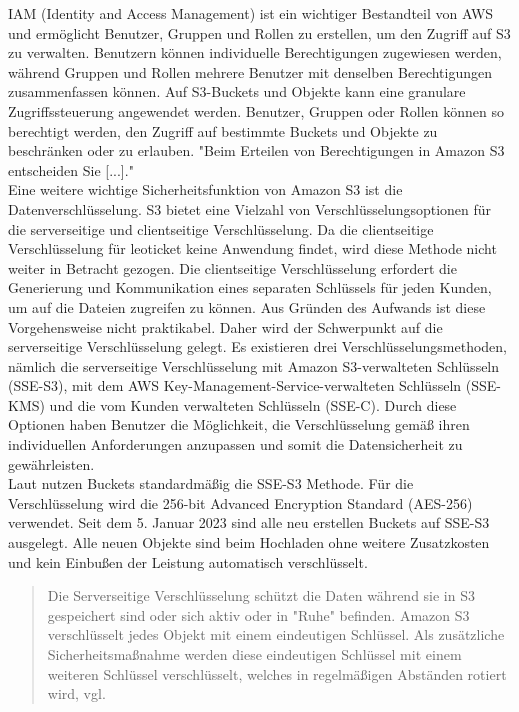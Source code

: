 IAM (Identity and Access Management) ist ein wichtiger Bestandteil von AWS und ermöglicht Benutzer, Gruppen und Rollen zu erstellen, um den Zugriff auf S3 zu verwalten. Benutzern können individuelle Berechtigungen zugewiesen werden, während Gruppen und Rollen mehrere Benutzer mit denselben Berechtigungen zusammenfassen können. Auf S3-Buckets und Objekte kann eine granulare Zugriffssteuerung angewendet werden. Benutzer, Gruppen oder Rollen können so berechtigt werden, den Zugriff auf bestimmte Buckets und Objekte zu beschränken oder zu erlauben. "Beim Erteilen von Berechtigungen in Amazon S3 entscheiden Sie [...]."\cite{aws-iam-s3}\\

Eine weitere wichtige Sicherheitsfunktion von Amazon S3 ist die Datenverschlüsselung. S3 bietet eine Vielzahl von Verschlüsselungsoptionen für die serverseitige und clientseitige Verschlüsselung. Da die clientseitige Verschlüsselung für leoticket keine Anwendung findet, wird diese Methode nicht weiter in Betracht gezogen. Die clientseitige Verschlüsselung erfordert die Generierung und Kommunikation eines separaten Schlüssels für jeden Kunden, um auf die Dateien zugreifen zu können. Aus Gründen des Aufwands ist diese Vorgehensweise nicht praktikabel. Daher wird der Schwerpunkt auf die serverseitige Verschlüsselung gelegt. Es existieren drei Verschlüsselungsmethoden, nämlich die serverseitige Verschlüsselung mit Amazon S3-verwalteten Schlüsseln (SSE-S3), mit dem AWS Key-Management-Service-verwalteten Schlüsseln (SSE-KMS) und die vom Kunden verwalteten Schlüsseln (SSE-C). Durch diese Optionen haben Benutzer die Möglichkeit, die Verschlüsselung gemäß ihren individuellen Anforderungen anzupassen und somit die Datensicherheit zu gewährleisten.\\

Laut \citeauthor{aws-iam-s3} nutzen Buckets standardmäßig die SSE-S3 Methode. Für die Verschlüsselung wird die 256-bit Advanced Encryption Standard (AES-256) verwendet. Seit dem 5. Januar 2023 sind alle neu erstellen Buckets auf SSE-S3 ausgelegt. Alle neuen Objekte sind beim Hochladen ohne weitere Zusatzkosten und kein Einbußen der Leistung automatisch verschlüsselt.

\begin{quote}
	Die Serverseitige Verschlüsselung schützt die Daten während sie in S3 gespeichert sind oder sich aktiv oder in "Ruhe" befinden. Amazon S3 verschlüsselt jedes Objekt mit einem eindeutigen Schlüssel. Als zusätzliche Sicherheitsmaßnahme werden diese eindeutigen Schlüssel mit einem weiteren Schlüssel verschlüsselt, welches in regelmäßigen Abständen rotiert wird, vgl. \cite{aws-iam-s3}
\end{quote}

